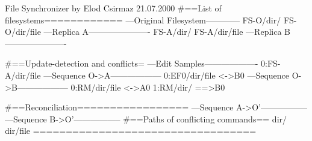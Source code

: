 File Synchronizer 
  by Elod Csirmaz 21.07.2000
#==List of filesystems============
---Original Filesystem------------
FS-O/dir/
FS-O/dir/file
---Replica A----------------------
FS-A/dir/
FS-A/dir/file
---Replica B----------------------


#==Update-detection and conflicts=
---Edit Samples-------------------
0:FS-A/dir/file
---Sequence O->A------------------
0:EF0/dir/file <->B0
---Sequence O->B------------------
0:RM/dir/file <->A0
1:RM/dir/ ==>B0

#==Reconciliation=================
---Sequence A->O'-----------------
---Sequence B->O'-----------------
#==Paths of conflicting commands==
dir/
dir/file
==================================
